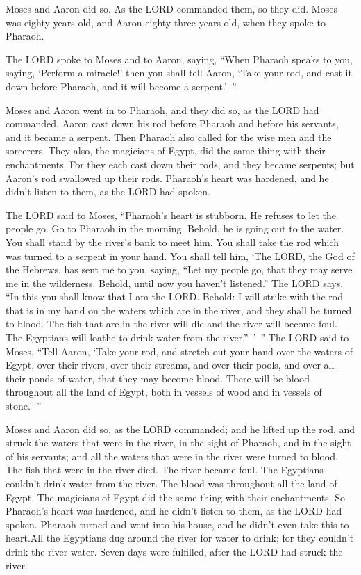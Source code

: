 \myverse{}Moses and Aaron did so. As the LORD commanded them, so they did. \myverse{}Moses was eighty years old, and Aaron eighty-three years old, when they spoke to Pharaoh.


\myverse{}The LORD spoke to Moses and to Aaron, saying, \myverse{}“When Pharaoh speaks to you, saying, ‘Perform a miracle!’ then you shall tell Aaron, ‘Take your rod, and cast it down before Pharaoh, and it will become a serpent.’ ”


\myverse{}Moses and Aaron went in to Pharaoh, and they did so, as the LORD had commanded. Aaron cast down his rod before Pharaoh and before his servants, and it became a serpent. \myverse{}Then Pharaoh also called for the wise men and the sorcerers. They also, the magicians of Egypt, did the same thing with their enchantments. \myverse{}For they each cast down their rods, and they became serpents; but Aaron’s rod swallowed up their rods. \myverse{}Pharaoh’s heart was hardened, and he didn’t listen to them, as the LORD had spoken.


\myverse{}The LORD said to Moses, “Pharaoh’s heart is stubborn. He refuses to let the people go. \myverse{}Go to Pharaoh in the morning. Behold, he is going out to the water. You shall stand by the river’s bank to meet him. You shall take the rod which was turned to a serpent in your hand. \myverse{}You shall tell him, ‘The LORD, the God of the Hebrews, has sent me to you, saying, “Let my people go, that they may serve me in the wilderness. Behold, until now you haven’t listened.” \myverse{}The LORD says, “In this you shall know that I am the LORD. Behold: I will strike with the rod that is in my hand on the waters which are in the river, and they shall be turned to blood. \myverse{}The fish that are in the river will die and the river will become foul. The Egyptians will loathe to drink water from the river.” ’ ” \myverse{}The LORD said to Moses, “Tell Aaron, ‘Take your rod, and stretch out your hand over the waters of Egypt, over their rivers, over their streams, and over their pools, and over all their ponds of water, that they may become blood. There will be blood throughout all the land of Egypt, both in vessels of wood and in vessels of stone.’ ”


\myverse{}Moses and Aaron did so, as the LORD commanded; and he lifted up the rod, and struck the waters that were in the river, in the sight of Pharaoh, and in the sight of his servants; and all the waters that were in the river were turned to blood. \myverse{}The fish that were in the river died. The river became foul. The Egyptians couldn’t drink water from the river. The blood was throughout all the land of Egypt. \myverse{}The magicians of Egypt did the same thing with their enchantments. So Pharaoh’s heart was hardened, and he didn’t listen to them, as the LORD had spoken. \myverse{}Pharaoh turned and went into his house, and he didn’t even take this to heart.\myverse{}All the Egyptians dug around the river for water to drink; for they couldn’t drink the river water. \myverse{}Seven days were fulfilled, after the LORD had struck the river.


